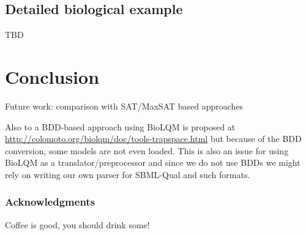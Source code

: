 \documentclass[runningheads]{llncs}
\begin{document}
\subsection{Detailed biological example}

TBD

\section{Conclusion}

Future work: comparison with SAT/MaxSAT based approaches~\cite{nabli2016enumerating}

Also to a BDD-based approach using BioLQM is proposed at \url{http://colomoto.org/biolqm/doc/tools-trapspace.html} but because of the BDD conversion, some models are not even loaded.
This is also an issue for using BioLQM as a translator/preprocessor and since we do not use BDDs we might rely on writing our own parser for SBML-Qual and such formats.

\subsubsection{Acknowledgments}
Coffee is good, you should drink some!



\end{document}
